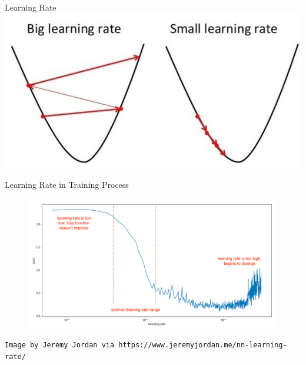 \documentclass[xcolor=pdftex,dvipsnames,table,mathserif]{beamer}
\begin{document}
\begin{frame}{Learning Rate}
\includegraphics[width=.95\columnwidth]{../graphics/BigLearningRate}
\end{frame}

\begin{frame}{Learning Rate in Training Process}
\begin{figure}
\includegraphics[width=.95\columnwidth]{../graphics/LearningRateEffect}
\end{figure}
\texttt{Image by Jeremy Jordan via https://www.jeremyjordan.me/nn-learning-rate/}
\end{frame}
\end{document}
